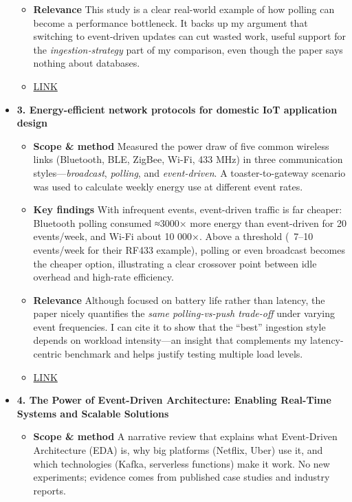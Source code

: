 \documentclass[11pt]{article}
\begin{document}
\begin{itemize}
\begin{itemize}
      \item[] \textbf{Relevance} This study is a clear real-world example of how polling can become a performance bottleneck.  It backs up my argument that switching to event-driven updates can cut wasted work, useful support for the \textit{ingestion‐strategy} part of my comparison, even though the paper says nothing about databases.
      \item[] \href{https://link.springer.com/article/10.1186/s13677-017-0080-5}{LINK}
  \end{itemize}
  \item[] \textbf{3. Energy-efficient network protocols for domestic IoT application design}
  \begin{itemize}
      \item[] \textbf{Scope \& method} Measured the power draw of five common wireless links (Bluetooth, BLE, ZigBee, Wi-Fi, 433 MHz) in three communication styles—\emph{broadcast}, \emph{polling}, and \emph{event-driven}.  
      A toaster-to-gateway  scenario was used to calculate weekly energy use at different event rates.
      
      \item[] \textbf{Key findings} With infrequent events, event-driven traffic is far cheaper: Bluetooth polling consumed ≈3000× more energy than event-driven for 20 events/week, and Wi-Fi about 10 000×.  
      Above a threshold (~7–10 events/week for their RF433 example), polling or even broadcast becomes the cheaper option, illustrating a clear crossover point between idle overhead and high-rate efficiency.
      
      \item[] \textbf{Relevance} Although focused on battery life rather than latency, the paper nicely quantifies the \textit{same polling-vs-push trade-off} under varying event frequencies.  
      I can cite it to show that the “best” ingestion style depends on workload intensity—an insight that complements my latency-centric benchmark and helps justify testing multiple load levels.
      \item[] \href{https://www.researchgate.net/publication/335426973\_Energy-Efficient\_Network\_Protocols\_for\_Domestic\_IoT\_Application\_Design}{LINK}
  \end{itemize}
  \item[] \textbf{4. The Power of Event-Driven Architecture: Enabling Real-Time Systems and Scalable Solutions}
  \begin{itemize}
      \item[] \textbf{Scope \& method} A narrative review that explains what Event-Driven Architecture (EDA) is, why big platforms (Netflix, Uber) use it, and which technologies (Kafka, serverless functions) make it work.  No new experiments; evidence comes from published case studies and industry reports.
      

\end{itemize}
\end{itemize}
\end{document}

